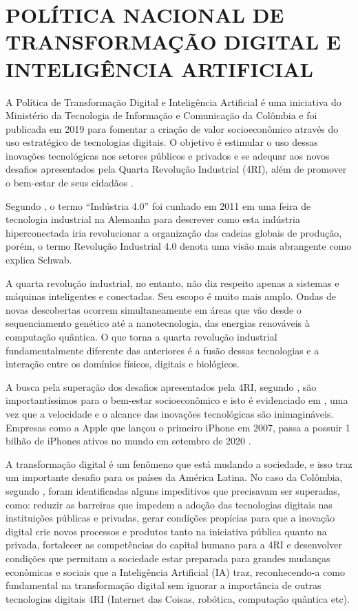\chapter{POLÍTICA NACIONAL DE TRANSFORMAÇÃO DIGITAL E INTELIGÊNCIA ARTIFICIAL}
\label{chap:politica}

A Política de Transformação Digital e Inteligência Artificial é uma iniciativa do Ministério da Tecnologia de Informação e Comunicação da Colômbia e foi publicada em 2019 para fomentar a criação de valor socioeconômico através do uso estratégico de tecnologias digitais. O objetivo é estimular o uso dessas inovações tecnológicas nos setores públicos e privados e se adequar aos novos desafios apresentados pela Quarta Revolução Industrial (4RI), além de promover o bem-estar de seus cidadãos \cite{de2019politica}.

Segundo \cite{schwab2019quarta}, o termo ``Indústria 4.0'' foi cunhado em 2011 em uma feira de tecnologia industrial na Alemanha para descrever como esta indústria hiperconectada iria revolucionar a organização das cadeias globais de produção, porém, o termo Revolução Industrial 4.0 denota uma visão mais abrangente como explica Schwab.

\begin{citacao}
A quarta revolução industrial, no entanto, não diz respeito apenas a sistemas e máquinas inteligentes e conectadas. Seu escopo é muito mais amplo. Ondas de novas descobertas ocorrem simultaneamente em áreas que vão desde o sequenciamento genético até a nanotecnologia, das energias renováveis à computação quântica. O que torna a quarta revolução industrial fundamentalmente diferente das anteriores é a fusão dessas tecnologias e a interação entre os domínios físicos, digitais e biológicos. \cite{schwab2019quarta}
\end{citacao}

A busca pela superação dos desafios apresentados pela 4RI, segundo \cite{de2019politica}, são importantíssimos para o bem-estar socioeconômico e isto é evidenciado em \cite{schwab2019quarta}, uma vez que a velocidade e o alcance das inovações tecnológicas são inimagináveis. Empresas como a Apple que lançou o primeiro iPhone em 2007, passa a possuir 1 bilhão de iPhones ativos no mundo em setembro de 2020 \cite{felipejunqueira}.

A transformação digital é um fenômeno que está mudando a sociedade, e isso traz um importante desafio para os países da América Latina. No caso da Colômbia, segundo \cite{de2019politica}, foram identificadas alguns impeditivos que precisavam ser superadas, como: reduzir as barreiras que impedem a adoção das tecnologias digitais nas instituições públicas e privadas, gerar condições propícias para que a inovação digital crie novos processos e produtos tanto na iniciativa pública quanto na privada, fortalecer as competências do capital humano para a 4RI e desenvolver condições que permitam a sociedade estar preparada para grandes mudanças econômicas e sociais que a Inteligência Artificial (IA) traz, reconhecendo-a como fundamental na transformação digital sem ignorar a importância de outras tecnologias digitais 4RI (Internet das Coisas, robótica, computação quântica etc).

